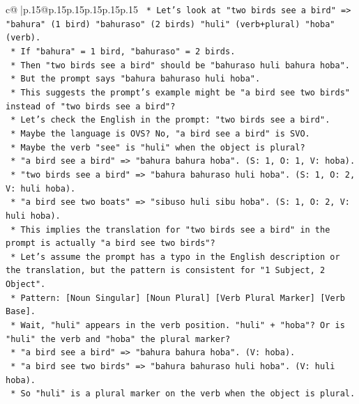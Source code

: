 \documentclass{article}
\begin{document}
{\begin{supertabular}{c@{$\;$}|p{.15\linewidth}@{}p{.15\linewidth}p{.15\linewidth}p{.15\linewidth}p{.15\linewidth}p{.15\linewidth}}
{{{\texttt{                *   Let's look at "two birds see a bird" => "bahura" (1 bird) "bahuraso" (2 birds) "huli" (verb+plural) "hoba" (verb).} \\
\texttt{                *   If "bahura" = 1 bird, "bahuraso" = 2 birds.} \\
\texttt{                *   Then "two birds see a bird" should be "bahuraso huli bahura hoba".} \\
\texttt{                *   But the prompt says "bahura bahuraso huli hoba".} \\
\texttt{                *   This suggests the prompt's example might be "a bird see two birds" instead of "two birds see a bird"?} \\
\texttt{                *   Let's check the English in the prompt: "two birds see a bird".} \\
\texttt{                *   Maybe the language is OVS? No, "a bird see a bird" is SVO.} \\
\texttt{                *   Maybe the verb "see" is "huli" when the object is plural?} \\
\texttt{                *   "a bird see a bird" => "bahura bahura hoba". (S: 1, O: 1, V: hoba).} \\
\texttt{                *   "two birds see a bird" => "bahura bahuraso huli hoba". (S: 1, O: 2, V: huli hoba).} \\
\texttt{                *   "a bird see two boats" => "sibuso huli sibu hoba". (S: 1, O: 2, V: huli hoba).} \\
\texttt{                *   This implies the translation for "two birds see a bird" in the prompt is actually "a bird see two birds"?} \\
\texttt{                *   Let's assume the prompt has a typo in the English description or the translation, but the pattern is consistent for "1 Subject, 2 Object".} \\
\texttt{                *   Pattern: {[}Noun Singular{]} {[}Noun Plural{]} {[}Verb Plural Marker{]} {[}Verb Base{]}.} \\
\texttt{                *   Wait, "huli" appears in the verb position. "huli" + "hoba"? Or is "huli" the verb and "hoba" the plural marker?} \\
\texttt{                *   "a bird see a bird" => "bahura bahura hoba". (V: hoba).} \\
\texttt{                *   "a bird see two birds" => "bahura bahuraso huli hoba". (V: huli hoba).} \\
\texttt{                *   So "huli" is a plural marker on the verb when the object is plural.} \\
}}}
\end{supertabular}}
\end{document}

